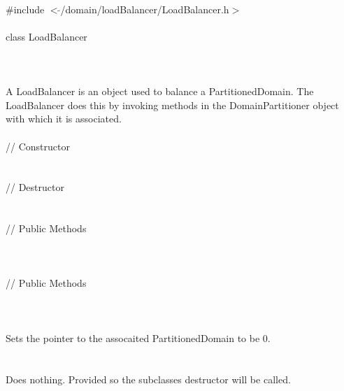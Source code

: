 
   \\
\indent \#include $<\tilde{ }$/domain/loadBalancer/LoadBalancer.h$>$  \\

  \\
\indent class LoadBalancer \\

 \\
 \\


  \\
\indent A LoadBalancer is an object used to balance a
PartitionedDomain. The LoadBalancer does this by invoking methods in
the DomainPartitioner object with which it is associated. \\

  \\
\indent\indent  // Constructor  \\
\indent{}\\ \\
\indent\indent // Destructor  \\
\indent{}  \\ \\
\indent\indent // Public Methods  \\
\indent{} \\ 
\indent{} \\ \\
\indent\indent // Public Methods  \\
\indent{}\\


\\
\\ 
Sets the pointer to the assocaited PartitionedDomain to be $0$. \\

 \\
  \\ 
Does nothing. Provided so the subclasses destructor will be called. \\

